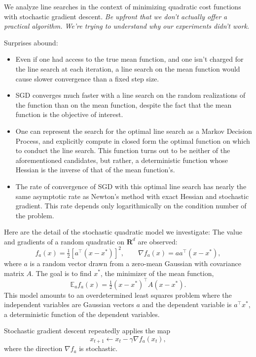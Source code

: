 \documentclass{article}
\newcommand{\half}{\tfrac{1}{2}}
\newcommand{\E}{\mathbb{E}}
\newcommand{\R}{\mathbf{R}}
\begin{document}
We analyze line searches in the context of minimizing quadratic cost functions with stochastic gradient descent. {\it Be upfront that we don't actually offer a practical algorithm. We're trying to understand why our experiments didn't work.} 

Surprises abound:
\begin{itemize}
    \item  Even if one had access to the true mean function, and one isn't charged for the line search at each iteration, a line search on the mean function would cause slower convergence than a fixed step size.
    \item SGD converges much faster with a line search on the random realizations of the function than on the mean function, despite the fact that the mean function is the objective of interest.
    \item One can represent the search for the optimal line search as a Markov Decision Process, and explicitly compute in closed form the optimal function on which to conduct the line search. This function turns out to be neither of the aforementioned candidates, but rather, a deterministic function whose Hessian is the inverse of that of the mean function's. 
    \item The rate of convergence of SGD with this optimal line search has nearly the same asymptotic rate  as Newton's method with exact Hessian and stochastic gradient. This rate depends only logarithmically on the condition number of the problem. 
\end{itemize}


Here are the detail of the stochastic quadratic model we investigate: The value and gradients of a random quadratic on $\R^d$ are observed:
\begin{equation}\label{eq:stoch-model}
f_a(x) = \half \left[a^\top (x-x^*)\right]^2, \qquad \nabla f_a(x) = aa^\top (x-x^*),
\end{equation}
where $a$ is a random vector drawn from a zero-mean Gaussian with covariance matrix $A$. The goal is to find $x^*$, the minimizer of the mean function,
\begin{equation}\label{eq:mean-model}
 \E_a f_a(x) = \half (x-x^*)^\top A (x-x^*).
\end{equation}
This model amounts to an overdetermined least squares problem where the independent variables are Gaussian vectors $a$ and the dependent variable is $a^\top x^*$,  a deterministic function of the dependent variables.

Stochastic gradient descent repeatedly applies the map
\begin{equation}
x_{t+1} \leftarrow x_t - \gamma \nabla f_a(x_t), \label{eq:sgd}
\end{equation}
where the direction $\nabla f_a$ is stochastic.
\end{document}
